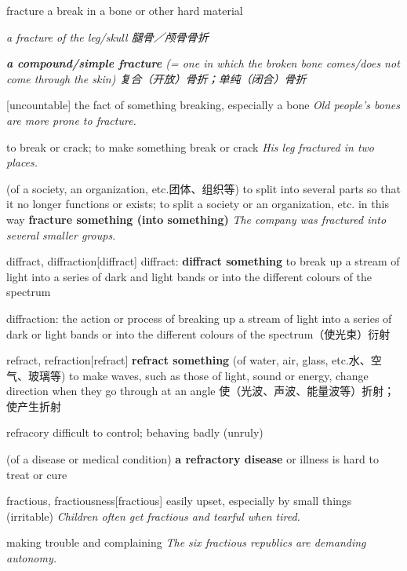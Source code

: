 \begin{DefWord}{fracture}
    a break in a bone or other hard material

    \textit{a fracture of the leg/skull 腿骨／颅骨骨折}

    \textit{\textbf{a compound/simple fracture} (= one in which the broken bone comes/does not come through the skin) 复合（开放）骨折；单纯（闭合）骨折}

    [uncountable] the fact of something breaking, especially a bone
    \textit{Old people's bones are more prone to fracture.}

    to break or crack; to make something break or crack
    \textit{His leg fractured in two places.}

    (of a society, an organization, etc.团体、组织等) to split into several parts so that it no longer functions or exists; to split a society or an organization, etc. in this way
    \textbf{fracture something (into something)} \textit{ The company was fractured into several smaller groups.}
\end{DefWord}

\begin{DefWord}{diffract, diffraction}[diffract]
    diffract: \textbf{diffract something} to break up a stream of light into a series of dark and light bands or into the different colours of the spectrum


    diffraction:
    the action or process of breaking up a stream of light into a series of dark or light bands or into the different colours of the spectrum（使光束）衍射
\end{DefWord}

\begin{DefWord}{refract, refraction}[refract]
    \textbf{refract something} (of water, air, glass, etc.水、空气、玻璃等) to make waves, such as those of light, sound or energy, change direction when they go through at an angle 使（光波、声波、能量波等）折射；使产生折射


\end{DefWord} 

\begin{DefWord}{refracory}
    difficult to control; behaving badly (unruly)

    (of a disease or medical condition) \textbf{a refractory disease} or illness is hard to treat or cure
\end{DefWord}

\begin{DefWord}{fractious, fractiousness}[fractious]
    easily upset, especially by small things (irritable)
    \textit{Children often get fractious and tearful when tired.}

    making trouble and complaining
    \textit{The six fractious republics are demanding autonomy.}
\end{DefWord}


